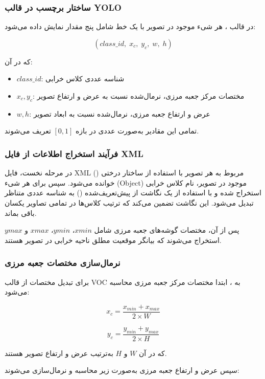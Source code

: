 \documentclass[a4paper, 10pt, twocolumn]{article}
\begin{document}
	\subsubsection*{ساختار برچسب در قالب YOLO}
	
	در قالب ، هر شیء موجود در تصویر با یک خط شامل پنج مقدار نمایش داده می‌شود:
	
	\[
	(class\_id,\; x_c,\; y_c,\; w,\; h)
	\]
	
	که در آن:
	\begin{itemize}
		\item \(class\_id\): شناسه عددی کلاس خرابی
		\item \(x_c, y_c\): مختصات مرکز جعبه مرزی، نرمال‌شده نسبت به عرض و ارتفاع تصویر
		\item \(w, h\): عرض و ارتفاع جعبه مرزی، نرمال‌شده نسبت به ابعاد تصویر
	\end{itemize}
	
	تمامی این مقادیر به‌صورت عددی در بازه \([0,1]\) تعریف می‌شوند.
	
	\subsubsection*{فرآیند استخراج اطلاعات از فایل XML}
	
	در مرحله نخست، فایل XML مربوط به هر تصویر با استفاده از ساختار درختی () خوانده می‌شود. سپس برای هر شیء (Object) موجود در تصویر، نام کلاس خرابی استخراج شده و با استفاده از یک نگاشت از پیش‌تعریف‌شده () به شناسه عددی متناظر تبدیل می‌شود. این نگاشت تضمین می‌کند که ترتیب کلاس‌ها در تمامی تصاویر یکسان باقی بماند.
	
	پس از آن، مختصات گوشه‌های جعبه مرزی شامل \(xmin\)، \(ymin\)، \(xmax\) و \(ymax\) استخراج می‌شوند که بیانگر موقعیت مطلق ناحیه خرابی در تصویر هستند.
	
	\subsubsection*{نرمال‌سازی مختصات جعبه مرزی}
	
	برای تبدیل مختصات از قالب VOC به ، ابتدا مختصات مرکز جعبه مرزی محاسبه می‌شود:
	
	\[
	x_c = \frac{x_{min} + x_{max}}{2 \times W}
	\]
	
	\[
	y_c = \frac{y_{min} + y_{max}}{2 \times H}
	\]
	
	که در آن \(W\) و \(H\) به‌ترتیب عرض و ارتفاع تصویر هستند.
	
	سپس عرض و ارتفاع جعبه مرزی به‌صورت زیر محاسبه و نرمال‌سازی می‌شوند:
	
\end{document}
